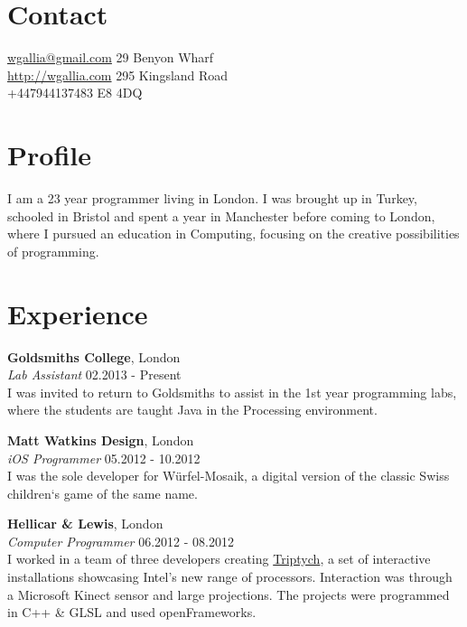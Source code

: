 \documentclass[margin,line,a4paper]{resume}
\begin{document}

\begin{resume}

\section{\mysidestyle Contact}

\hypersetup{urlcolor=Fuchsia}
\href{mailto:wgallia@gmail.com}{wgallia@gmail.com}	\hfill 	29 Benyon Wharf   \\
\hypersetup{urlcolor=RoyalBlue}
\href{http://wgallia.com}{http://wgallia.com}		\hfill  295 Kingsland Road \\
+447944137483										\hfill	E8 4DQ \\

\section{\mysidestyle Profile}

I am a 23 year programmer living in London. I was brought up in Turkey, schooled in Bristol and spent a year in Manchester before coming to London, where I pursued an education in Computing, focusing on the creative possibilities of programming.

\section{\mysidestyle Experience}

\textbf{Goldsmiths College}, London \vspace{1mm}\\
\textsl{Lab Assistant} \hfill 02.2013 - Present \vspace{2mm} \\
I was invited to return to Goldsmiths to assist in the 1st year programming labs, where the students are taught Java in the Processing environment. 

\textbf{Matt Watkins Design}, London \vspace{1mm}\\
\textsl{iOS Programmer} \hfill 05.2012 - 10.2012 \vspace{2mm} \\
I was the sole developer for Würfel-Mosaik, a digital version of the classic Swiss children`s game of the same name. 

\textbf{Hellicar \& Lewis}, London \vspace{1mm}\\
\textsl{Computer Programmer} \hfill 06.2012 - 08.2012 \vspace{2mm} \\
I worked in a team of three developers creating \href{http://www.hellicarandlewis.com/2012/07/19/triptych}{Triptych}, a set of interactive installations showcasing Intel's new range of processors. Interaction was through a Microsoft Kinect sensor and large projections. The projects were programmed in C++ \& GLSL and used openFrameworks.


\end{resume}
\end{document}
